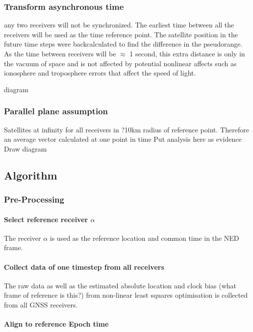 \documentclass[11pt,a4paper]{article}
\begin{document}
\subsubsection{Transform asynchronous time}
any two receivers will not be synchronized. The earliest time between all the receivers will be used as the time reference point. The satellite position in the future time steps were backcalculated to find the difference in the pseudorange. As the time between receivers will be $\approx$ 1 second, this extra distance is only in the vacuum of space and is not affected by potential nonlinear affects such as ionosphere and troposphere errors that affect the speed of light.

diagram

\subsubsection{Parallel plane assumption}
Satellites at infinity for all receivers in ?10km radius of reference point. Therefore an average vector calculated at one point in time  
Put analysis here as evidence
Draw diagram



\subsection{Algorithm}

\subsubsection{Pre-Processing}
\paragraph{Select reference receiver $\alpha$}
The receiver $\alpha$ is used as the reference location and common time in the NED frame. 
\paragraph{Collect data of one timestep from all receivers}
The raw data as well as the estimated absolute location and clock bias (what frame of reference is this?) from non-linear least squares optimisation is collected from all GNSS receivers.
\paragraph{Align to reference Epoch time}\label{timetransform}
\end{document}
